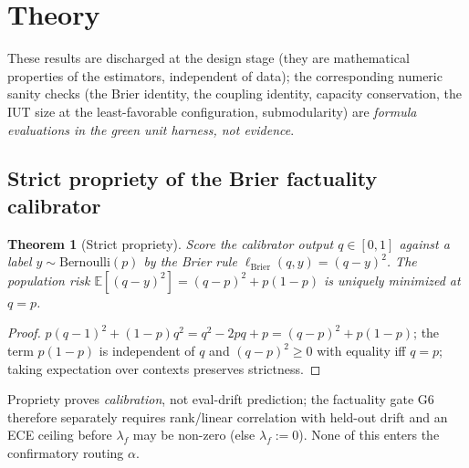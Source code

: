 \documentclass[11pt]{article}
\newtheorem{theorem}{Theorem}
\theoremstyle{definition}
\newcommand{\E}{\mathbb{E}}
\begin{document}
\section{Theory}
\label{sec:theory}
These results are discharged at the design stage (they are mathematical properties of the
estimators, independent of data); the corresponding numeric sanity checks (the Brier
identity, the coupling identity, capacity conservation, the IUT size at the
least-favorable configuration, submodularity) are \emph{formula evaluations in the green
unit harness, not evidence}.

\subsection{Strict propriety of the Brier factuality calibrator}
\begin{theorem}[Strict propriety]
\label{thm:brier}
Score the calibrator output $q\in[0,1]$ against a label $y\sim\mathrm{Bernoulli}(p)$ by
the Brier rule $\ell_{\mathrm{Brier}}(q,y)=(q-y)^2$. The population risk
$\E[(q-y)^2]=(q-p)^2+p(1-p)$ is uniquely minimized at $q=p$.
\end{theorem}
\begin{proof}
$p(q-1)^2+(1-p)q^2=q^2-2pq+p=(q-p)^2+p(1-p)$; the term $p(1-p)$ is independent of $q$ and
$(q-p)^2\ge0$ with equality iff $q=p$; taking expectation over contexts preserves
strictness.
\end{proof}
\noindent Propriety proves \emph{calibration}, not eval-drift prediction; the factuality
gate G6 therefore separately requires rank/linear correlation with held-out drift and an
ECE ceiling before $\lambda_f$ may be non-zero (else $\lambda_f:=0$). None of this enters
the confirmatory routing $\alpha$.
\end{document}
